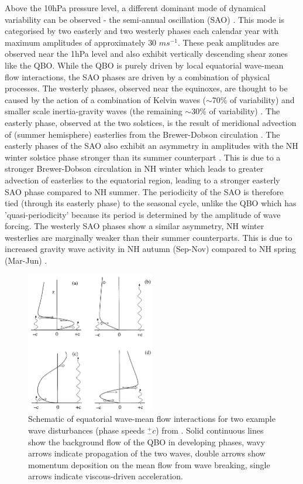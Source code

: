 Above the 10hPa pressure level, a different dominant mode of dynamical variability can be observed - the semi-annual oscillation (SAO) \citep{garciaClimatology1997}. This mode is categorised by two easterly and two westerly phases each calendar year with maximum amplitudes of approximately 30 $ms^{-1}$. These peak amplitudes are observed near the 1hPa level and also exhibit vertically descending shear zones like the QBO. While the QBO is purely driven by local equatorial wave-mean flow interactions, the SAO phases are driven by a combination of physical processes. The westerly phases, observed near the equinoxes, are thought to be caused by the action of a combination of Kelvin waves ($\sim$70\% of variability) and smaller scale inertia-gravity waves (the remaining $\sim$30\% of variability) \citep{dunkertonRole1979,hitchmanEstimation1988}. The easterly phase, observed at the two solstices, is the result of meridional advection of (summer hemisphere) easterlies from the Brewer-Dobson circulation \citep{holtonNumerical1980}. The easterly phases of the SAO also exhibit an asymmetry in amplitudes with the NH winter solstice phase stronger than its summer counterpart \citep{dunkertonRole1979}. This is due to a stronger Brewer-Dobson circulation in NH winter which leads to greater advection of easterlies to the equatorial region, leading to a stronger easterly SAO phase compared to NH summer. The periodicity of the SAO is therefore tied (through its easterly phase) to the seasonal cycle, unlike the QBO which has 'quasi-periodicity' because its period is determined by the amplitude of wave forcing. The westerly SAO phases show a similar asymmetry, NH winter westerlies are marginally weaker than their summer counterparts. This is due to increased gravity wave activity in NH autumn (Sep-Nov) compared to NH spring (Mar-Jun) \citep{rayAnalysis1998}. 

\begin{figure}[h!]
\centering
    \includegraphics[width=0.5\textwidth]{Figures/Figures-background/Schematic_of_QBO_waves.png}
    \caption[Schematic of equatorial wave-mean flow interactions.]{Schematic of equatorial wave-mean flow interactions for two example wave disturbances (phase speeds $^+_- c$) from \cite{plumbQuasibiennial1984}. Solid continuous lines show the background flow of the QBO in developing phases, wavy arrows indicate propagation of the two waves, double arrows show momentum deposition on the mean flow from wave breaking, single arrows indicate viscous-driven acceleration.}
    \label{fig:QBO_wave_schematic}
\centering
\end{figure}

